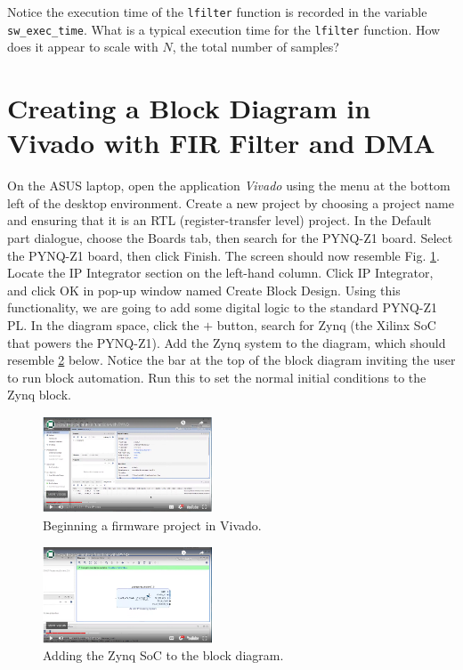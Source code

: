 \documentclass{article}
\begin{document}
\noindent
Notice the execution time of the \verb+lfilter+ function is recorded in the variable \verb+sw_exec_time+.  What is a typical execution time for the \verb+lfilter+ function.  How does it appear to scale with $N$, the total number of samples?

\section{Creating a Block Diagram in Vivado with FIR Filter and DMA}

On the ASUS laptop, open the application \textit{Vivado} using the menu at the bottom left of the desktop environment.  Create a new project by choosing a project name and ensuring that it is an RTL (register-transfer level) project.  In the Default part dialogue, choose the Boards tab, then search for the PYNQ-Z1 board.  Select the PYNQ-Z1 board, then click Finish.  The screen should now resemble Fig. \ref{fig:vid_1}.  Locate the IP Integrator section on the left-hand column.  Click IP Integrator, and click OK in pop-up window named Create Block Design.  Using this functionality, we are going to add some digital logic to the standard PYNQ-Z1 PL.  In the diagram space, click the $+$ button, search for Zynq (the Xilinx SoC that powers the PYNQ-Z1).  Add the Zynq system to the diagram, which should resemble \ref{fig:vid_2} below.  Notice the bar at the top of the block diagram inviting the user to run block automation.  Run this to set the normal initial conditions to the Zynq block.

\begin{figure}
\centering
\includegraphics[width=0.45\textwidth]{fir_video_1.png}
\caption{\label{fig:vid_1} Beginning a firmware project in Vivado.}
\end{figure}

\begin{figure}[hb]
\centering
\includegraphics[width=0.45\textwidth]{fir_video_2.png}
\caption{\label{fig:vid_2} Adding the Zynq SoC to the block diagram.}
\end{figure}
\end{document}
